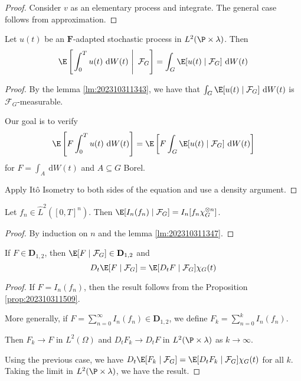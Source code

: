\begin{proof}
	Consider $v$ as an elementary process and integrate. The general case follows from approximation.
\end{proof}

\begin{lemma}\label{lm:202310311347}
	Let $u(t)$ be an $\mathbf{F}$-adapted stochastic process in $L^2(\P \times \lambda)$. Then 
	$$
	\E \left[ \left.\int_0^T u(t) ~\mathrm{d}W(t) ~\right| ~\mathcal{F}_G \right] = \int_G \E [u(t) \mid \mathcal{F}_G] ~\mathrm{d} W(t)
	$$
\end{lemma}

\begin{proof}
	By the lemma \ref{lm:202310311343}, we have that $\int_G \E [u(t) \mid \mathcal{F}_G] ~\mathrm{d} W(t)$ is $\mathcal{F}_G$-measurable. 

	Our goal is to verify
	$$
	\E \left[ F \int_0^T u(t) ~\mathrm{d}W(t) \right] = \E \left[ F \int_G \E[u(t) \mid \mathcal{F}_G] ~\mathrm{d}W(t) \right]
	$$
	for $F = \int_A ~\mathrm{d}W(t)$ and $A \subseteq G$ Borel. 

	Apply Itô Isometry to both sides of the equation and use a density argument. 

\end{proof}

\begin{proposition}\label{prop:202310311509} 
	Let $f_n \in \hat{L}^2([0,T]^n)$. Then $\E[I_n(f_n) \mid \mathcal{F}_G] = I_n[f_n \chi_G^{\otimes n}]$.
\end{proposition}

\begin{proof}
	By induction on $n$ and the lemma \ref{lm:202310311347}.
\end{proof}

\begin{proposition}\label{prop:202310311506} 
	If $F \in  \mathbf{D}_{1,2}$, then $\E[F \mid \mathcal{F}_G] \in \mathbf{D}_{1,2}$ and 
	$$
	D_t \E[F \mid \mathcal{F}_G] = \E[D_t F \mid \mathcal{F}_G] \chi_G(t)
	$$
\end{proposition}

\begin{proof}
	If $F = I_n(f_n)$, then the result follows from the Proposition \ref{prop:202310311509}. 

	More generally, if $F = \sum_{n=0}^\infty I_n(f_n) \in \mathbf{D}_{1,2}$, we define $F_k = \sum_{n=0}^k I_n(f_n)$.

	Then $F_k \to F$ in $L^2(\Omega)$ and $D_t F_k \to D_t F$ in $L^2(\P \times \lambda)$ as $k \to \infty$. 

	Using the previous case, we have $D_t \E[F_k \mid \mathcal{F}_G] = \E[D_t F_k \mid \mathcal{F}_G] \chi_G(t)$ for all $k$. Taking the limit in $L^2(\P \times \lambda)$, we have the result. 
\end{proof}

